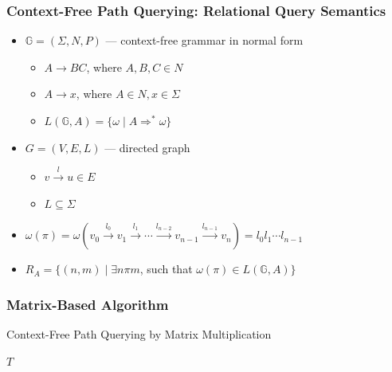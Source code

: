 \documentclass[xcolor=table]{beamer}
\begin{document}
  \begin{frame}[fragile]
    \frametitle{Context-Free Path Querying: Relational Query Semantics}
    \begin{itemize}
      \item $\mathbb{G} = (\Sigma, N, P)$ --- context-free grammar in normal form
      \begin{itemize}
        \item $A \rightarrow B C$, where $A, B, C \in N$
        \item $A \rightarrow x$, where $A \in N, x \in \Sigma$
        \item $L(\mathbb{G},A) = \{ \omega \mid A \Rightarrow^* \omega \}$
      \end{itemize}
      \item $G = (V,E,L)$ --- directed graph
        \begin{itemize}
          \item $v \xrightarrow{l} u \in E$
          \item $L \subseteq \Sigma$
        \end{itemize}
      \item $\omega(\pi) = \omega(v_0 \xrightarrow{l_0} v_1 \xrightarrow{l_1} \cdots \xrightarrow{l_{n-2}} v_{n-1} \xrightarrow{l_{n-1}} v_n) = l_0 l_1 \cdots l_{n-1}$
      \item $R_A = \{ (n, m) \mid \exists n \pi m$, such that $\omega(\pi) \in L(\mathbb{G},A)\}$
    \end{itemize}
  \end{frame}

  \begin{frame}[fragile] \frametitle{Matrix-Based Algorithm}
    \begin{algorithm}[H]
    \begin{algorithmic}[1]
    \caption{Context-Free Path Querying by Matrix Multiplication}

        \EndFor
        \EndWhile
    \State \Return $T$
    \EndFunction
    \end{algorithmic}
    \end{algorithm}
  \end{frame}
\end{document}
